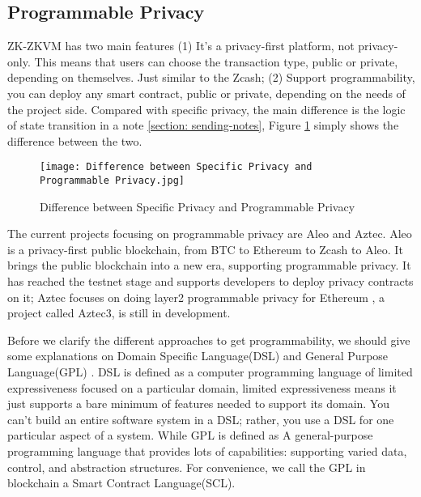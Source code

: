 \subsection{Programmable Privacy}

ZK-ZKVM has two main features (1) It's a privacy-first platform, not privacy-only. This means that users can 
choose the transaction type, public or private, depending on themselves. Just similar to the Zcash\cite{website:Zcash}; 
(2) Support programmability, you can deploy any smart contract, public or 
private, depending on the needs of the project side. Compared with specific 
privacy, the main difference is the logic of state transition in a note \ref{section: sending-notes}, Figure \ref{fig:Difference between Specific Privacy and Programmable Privacy} simply shows the difference 
between the two.
\begin{figure}[!ht]
    \centering
    \texttt{[image: Difference between Specific Privacy and Programmable Privacy.jpg]}
    \caption{Difference between Specific Privacy and Programmable Privacy}
    \label{fig:Difference between Specific Privacy and Programmable Privacy}
\end{figure}

The current projects focusing on programmable privacy are Aleo\cite{website:Aleo} and Aztec\cite{website:Aztec}. Aleo\cite{website:Aleo} is a 
privacy-first public blockchain, from BTC\cite{website:BTC} to Ethereum\cite{website:Ethereum} to Zcash\cite{website:Zcash} to Aleo\cite{website:Aleo}. It brings the public blockchain into a new era,
supporting programmable privacy. 
It has reached the testnet stage and supports developers to deploy privacy contracts on it; 
Aztec\cite{website:Aztec} focuses on doing layer2 programmable privacy for Ethereum\cite{website:Ethereum} , a project 
called Aztec3\cite{website:Aztec3}, is still in development.

Before we clarify the different approaches to get programmability, we should give some explanations on Domain Specific Language(DSL) \cite{website:DSL} and General Purpose Language(GPL) \cite{website:DSL}.
DSL\cite{website:DSL} is defined as a computer programming language of limited expressiveness focused on a particular domain, limited expressiveness means it just supports a bare minimum of features 
needed to support its domain. You can't build an entire software system in a DSL; rather, you use a DSL\cite{website:DSL} for one particular aspect of a system. While GPL\cite{website:DSL} is defined as A general-purpose programming language
that provides lots of capabilities: supporting varied data, control, and abstraction structures. For convenience, we call the GPL in blockchain a Smart Contract Language(SCL).

